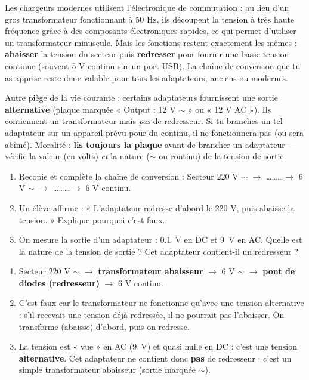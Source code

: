\documentclass[11pt]{article}
\newcommand{\cle}[1]{{\popxbold\color{popdark}#1}}
\begin{document}
\begin{savaistu}
Les chargeurs modernes utilisent l'\cle{électronique de commutation} : au lieu d'un gros transformateur fonctionnant à 50 Hz, ils découpent la tension à très haute fréquence grâce à des composants électroniques rapides, ce qui permet d'utiliser un transformateur minuscule. Mais les fonctions restent exactement les mêmes : \textbf{abaisser} la tension du secteur puis \textbf{redresser} pour fournir une basse tension continue (souvent 5 V continu sur un port USB). La chaîne de conversion que tu as apprise reste donc valable pour tous les adaptateurs, anciens ou modernes.

Autre piège de la vie courante : certains adaptateurs fournissent une sortie \textbf{alternative} (plaque marquée « Output : 12 V $\sim$ » ou « 12 V AC »). Ils contiennent un transformateur mais \emph{pas} de redresseur. Si tu branches un tel adaptateur sur un appareil prévu pour du continu, il ne fonctionnera pas (ou sera abîmé). Moralité : \textbf{lis toujours la plaque} avant de brancher un adaptateur — vérifie la valeur (en volts) \emph{et} la nature ($\sim$ ou continu) de la tension de sortie.
\end{savaistu}

\begin{exercice}
\begin{enumerate}
\item Recopie et complète la chaîne de conversion : Secteur 220 V $\sim$ $\rightarrow$ \ldots\ldots\ldots $\rightarrow$ 6 V $\sim$ $\rightarrow$ \ldots\ldots\ldots $\rightarrow$ 6 V continu.
\item Un élève affirme : « L'adaptateur redresse d'abord le 220 V, puis abaisse la tension. » Explique pourquoi c'est faux.
\item On mesure la sortie d'un adaptateur : \SI{0,1}{V} en DC et \SI{9}{V} en AC. Quelle est la nature de la tension de sortie ? Cet adaptateur contient-il un redresseur ?
\end{enumerate}
\end{exercice}

\begin{corrige}[Exercice]
\begin{enumerate}
\item Secteur 220 V $\sim$ $\rightarrow$ \textbf{transformateur abaisseur} $\rightarrow$ 6 V $\sim$ $\rightarrow$ \textbf{pont de diodes (redresseur)} $\rightarrow$ 6 V continu.
\item C'est faux car le transformateur ne fonctionne qu'avec une tension alternative : s'il recevait une tension déjà redressée, il ne pourrait pas l'abaisser. On transforme (abaisse) d'abord, puis on redresse.
\item La tension est « vue » en AC (\SI{9}{V}) et quasi nulle en DC : c'est une tension \textbf{alternative}. Cet adaptateur ne contient donc \textbf{pas} de redresseur : c'est un simple transformateur abaisseur (sortie marquée $\sim$).
\end{enumerate}
\end{corrige}
\end{document}
